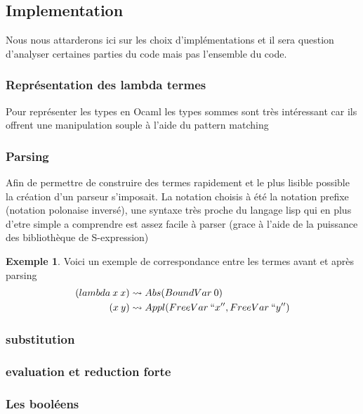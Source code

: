 \documentclass {article}
\theoremstyle{definition}
\newtheorem{example}{Exemple}
\theoremstyle{remark}
\begin{document}
\subsection{Implementation}

Nous nous attarderons ici sur les choix d'implémentations et il sera question
d'analyser certaines parties du code mais pas l'ensemble du code.

\subsubsection{Représentation des lambda termes}
Pour représenter les types en Ocaml les types sommes sont très intéressant car 
ils offrent une manipulation souple à l'aide du pattern matching



\subsubsection{Parsing}
Afin de permettre de construire des termes rapidement et le plus lisible 
possible la création d'un parseur s'imposait.
La notation choisis à été la notation prefixe (notation polonaise inversé),
une syntaxe très proche du langage lisp qui en plus d'etre simple a comprendre
est assez facile à parser (grace à l'aide de la puissance des bibliothèque
de S-expression)
\begin{example}
  Voici un exemple de correspondance entre les termes avant et après parsing
  \begin{align*}
    (lambda\: x \: x) & \leadsto Abs(BoundVar\: 0) \\
    (x\: y) & \leadsto Appl(FreeVar\: ``x'',FreeVar\: ``y'')       
  \end{align*}
\end{example}



\subsubsection{substitution}

\subsubsection{evaluation et reduction forte}

\subsubsection{Les booléens}
\end{document}

